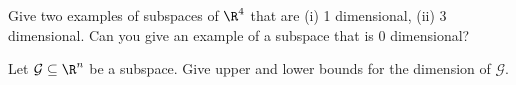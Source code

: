 \begin{exercises}
\begin{problist}
\begin{solution}
		\end{solution}
		
		\prob Give two examples of subspaces of $\R^4$ that are (i) 1 dimensional, (ii)
		3 dimensional. Can you give an example of a subspace that is 0 dimensional? 
		\begin{solution}
		
		\end{solution}
		
		\prob Let $\mathcal G\subseteq \R^n$ be a subspace.
		Give upper and lower bounds for the dimension of $\mathcal G$.
		\begin{solution}
		
		\end{solution}
	\end{problist}
\end{exercises}
